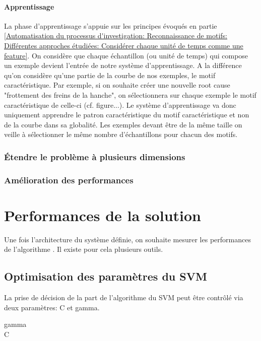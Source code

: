 \paragraph{Apprentissage} La phase d'apprentissage s'appuie sur les principes évoqués en partie \ref{Automatisation du processus d'investigation: Reconnaissance de motifs: Différentes approches étudiées: Considérer chaque unité de temps comme une feature}. On considère que chaque échantillon (ou unité de temps) qui compose un exemple devient l'entrée de notre système d'apprentissage. A la différence qu'on considère qu'une partie de la courbe de nos exemples, le motif caractéristique. Par exemple, si on souhaite créer une nouvelle root cause "frottement des freins de la hanche", on sélectionnera sur chaque exemple le motif caractéristique de celle-ci (cf. figure...). Le système d'apprentissage va donc uniquement apprendre le patron caractéristique du motif caractéristique et non de la courbe dans sa globalité. Les exemples devant être de la même taille on veille à sélectionner le même nombre d'échantillons pour chacun des motifs. 

\subsubsection{Étendre le problème à plusieurs dimensions }
\label{Automatisation du processus d'investigation: Reconnaissance de motifs: Étendre le problème à plusieurs dimensions}


\subsubsection{Amélioration des performances}
\label{Automatisation du processus d'investigation: Reconnaissance de motifs: Amélioration des performances}




\section{Performances de la solution}
\label{Automatisation du processus d'investigation: Performances de la solution}
Une fois l'architecture du système définie, on souhaite mesurer les performances de l'algorithme . Il existe pour cela plusieurs outils.

\subsection{Optimisation des paramètres du SVM}
\label{Industrialisation du produit: Performances de la solution:Optimisation des paramètres du SVM}
La prise de décision de la part de l'algorithme du SVM peut être contrôlé via deux paramètres: C et gamma.
\begin{description}
	\item [gamma] 
	\item [C]
\end{description}

